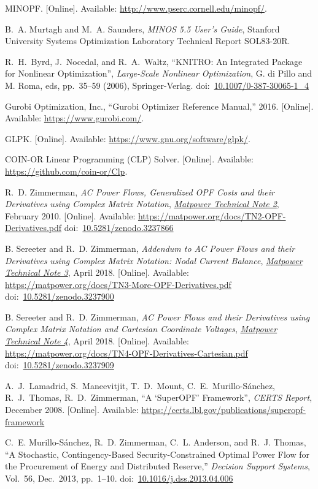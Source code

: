 \documentclass[12pt]{article}
\newcommand{\matpower}[0]{{\sc Matpower}}
\newcommand{\TNtwourl}[0]{https://matpower.org/docs/TN2-OPF-Derivatives.pdf}
\newcommand{\TNtwo}[0]{\href{\TNtwourl}{\it \matpower{} Technical Note 2}}
\newcommand{\TNthreeurl}[0]{https://matpower.org/docs/TN3-More-OPF-Derivatives.pdf}
\newcommand{\TNthree}[0]{\href{\TNthreeurl}{\it \matpower{} Technical Note 3}}
\newcommand{\TNfoururl}[0]{https://matpower.org/docs/TN4-OPF-Derivatives-Cartesian.pdf}
\newcommand{\TNfour}[0]{\href{\TNfoururl}{\it \matpower{} Technical Note 4}}
\newcommand{\doi}[1]{doi:~\href{https://doi.org/#1}{#1}}
\numberwithin{equation}{section}
\numberwithin{table}{section}
\numberwithin{figure}{section}
\begin{document}
\begin{thebibliography}{99}
MINOPF. [Online]. Available:
  \url{http://www.pserc.cornell.edu/minopf/}.

B.~A. Murtagh and M.~A. Saunders, \emph{MINOS 5.5 User's Guide}, Stanford
  University Systems Optimization Laboratory Technical Report SOL83-20R.

R.~H.~Byrd, J.~Nocedal, and R.~A.~Waltz, ``KNITRO: An Integrated Package for Nonlinear Optimization'', \emph{Large-Scale Nonlinear Optimization}, G. di Pillo and M. Roma, eds, pp.~35--59 (2006), Springer-Verlag.
doi:~\href{https://doi.org/10.1007/0-387-30065-1_4}{10.1007/0-387-30065-1\_4}

Gurobi Optimization, Inc., ``Gurobi Optimizer Reference Manual,'' 2016. [Online]. Available:
  \url{https://www.gurobi.com/}.

GLPK. [Online]. Available:
  \url{https://www.gnu.org/software/glpk/}.

COIN-OR Linear Programming (CLP) Solver. [Online]. Available:
  \url{https://github.com/coin-or/Clp}.

R.~D. Zimmerman, \emph{AC Power Flows, Generalized OPF Costs and their Derivatives using Complex Matrix Notation}, \TNtwo, February 2010. [Online]. Available: \url{\TNtwourl}
\doi{10.5281/zenodo.3237866}

B. Sereeter and R.~D. Zimmerman, \emph{Addendum to AC Power Flows and their Derivatives using Complex Matrix Notation: Nodal Current Balance}, \TNthree, April 2018. [Online]. Available: \url{\TNthreeurl}
\doi{10.5281/zenodo.3237900}

B. Sereeter and R.~D. Zimmerman, \emph{AC Power Flows and their Derivatives using Complex Matrix Notation and Cartesian Coordinate Voltages}, \TNfour, April 2018. [Online]. Available: \url{\TNfoururl}
\doi{10.5281/zenodo.3237909}

A.~J.~Lamadrid, S.~Maneevitjit, T.~D.~Mount, C.~E.~Murillo-S{\'a}nchez, R.~J.~Thomas, R.~D.~Zimmerman, ``A `SuperOPF' Framework'', \emph{CERTS Report}, December 2008. [Online]. Available: \url{https://certs.lbl.gov/publications/superopf-framework}

C.~E. Murillo-S{\'a}nchez, R.~D. Zimmerman, C.~L. Anderson, and R.~J. Thomas, ``A Stochastic, Contingency-Based Security-Constrained Optimal Power Flow for the Procurement of Energy and Distributed Reserve,'' \emph{Decision Support Systems}, Vol.~56, Dec.~2013, pp.~1--10.
\doi{10.1016/j.dss.2013.04.006}


\end{thebibliography}
\end{document}
